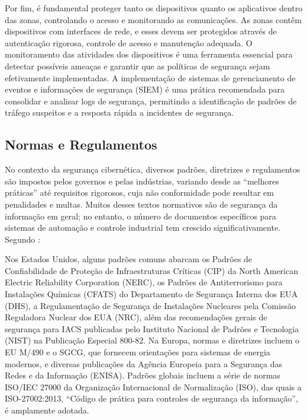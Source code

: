         Por fim, é fundamental proteger tanto os dispositivos quanto os aplicativos dentro das zonas, controlando o acesso e monitorando as comunicações. As zonas contêm dispositivos com interfaces de rede, e esses devem ser protegidos através de autenticação rigorosa, controle de acesso e manutenção adequada. O monitoramento das atividades dos dispositivos é uma ferramenta essencial para detectar possíveis ameaças e garantir que as políticas de segurança sejam efetivamente implementadas. A implementação de sistemas de gerenciamento de eventos e informações de segurança (SIEM) é uma prática recomendada para consolidar e analisar logs de segurança, permitindo a identificação de padrões de tráfego suspeitos e a resposta rápida a incidentes de segurança.

    \subsection{Normas e Regulamentos}

        No contexto da segurança cibernética, diversos padrões, diretrizes e regulamentos são impostos pelos governos e pelas indústrias, variando desde as ``melhores práticas'' até requisitos rigorosos, cuja não conformidade pode resultar em penalidades e multas. Muitos desses textos normativos são de segurança da informação em geral; no entanto, o número de documentos específicos para sistemas de automação e controle industrial tem crescido significativamente. Segundo :

        \begin{citacao}
            Nos Estados Unidos, alguns padrões comuns abarcam os Padrões de Confiabilidade de Proteção de Infraestruturas Críticas (CIP) da North American Electric Reliability Corporation (NERC), os Padrões de Antiterrorismo para Instalações Químicas (CFATS) do Departamento de Segurança Interna dos EUA (DHS), a Regulamentação de Segurança de Instalações Nucleares pela Comissão Reguladora Nuclear dos EUA (NRC), além das recomendações gerais de segurança para IACS publicadas pelo Instituto Nacional de Padrões e Tecnologia (NIST) na Publicação Especial 800-82. Na Europa, normas e diretrizes incluem o EU M/490 e o SGCG, que fornecem orientações para sistemas de energia modernos, e diversas publicações da Agência Europeia para a Segurança das Redes e da Informação (ENISA). Padrões globais incluem a série de normas ISO/IEC 27000 da Organização Internacional de Normalização (ISO), das quais a ISO-27002:2013, “Código de prática para controles de segurança da informação”, é amplamente adotada.
        \end{citacao}
        

